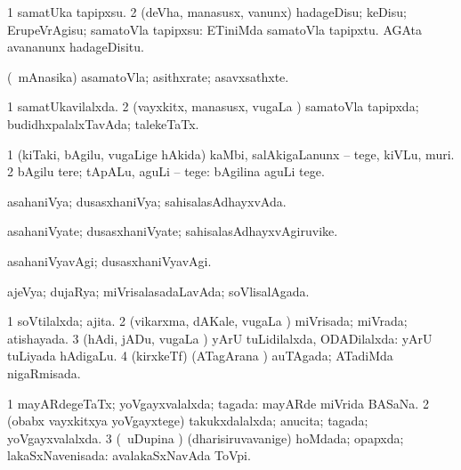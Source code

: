\bentry
{} 
\gl{\sakirx}
\expl{}
\bmng
\bnum
\num{1} samatUka tapipxsu. 
\num{2} (deVha, manasusx, \mo vanunx) hadageDisu; keDisu; ErupeVrAgisu; samatoVla tapipxsu:  ETiniMda samatoVla tapipxtu.  AGAta avananunx hadageDisitu. 
\enum
\emng
\eentry

\bentry
{} 
\gl{\nA}
\expl{}
\bmng
(\kanmu\ mAnasika) asamatoVla; asithxrate; asavxsathxte. 
\emng
\eentry

\bentry
{} 
\gl{\gu}
\expl{}
\bmng
\bnum
\num{1} samatUkavilalxda. 
\num{2} (vayxkitx, manasusx, \mo vugaLa \vi) samatoVla tapipxda; budidhxpalalxTavAda; talekeTaTx. 
\enum
\emng
\eentry

\bentry
{} 
\gl{\sakirx}
\bmng
\bnum
\num{1} (kiTaki, bAgilu, \mo vugaLige hAkida) kaMbi, salAkigaLanunx -- tege, kiVLu, muri. 
\num{2} bAgilu tere; tApALu, aguLi -- tege:  bAgilina aguLi tege. 
\enum
\emng
\eentry

\bentry
{} 
\gl{\gu}
\expl{}
\bmng
asahaniVya; dusasxhaniVya; sahisalasAdhayxvAda. 
\emng
\eentry

\bentry
{} 
\gl{\nA}
\expl{}
\bmng
asahaniVyate; dusasxhaniVyate; sahisalasAdhayxvAgiruvike. 
\emng
\eentry

\bentry
{} 
\gl{\kirxvi}
\expl{}
\bmng
asahaniVyavAgi; dusasxhaniVyavAgi. 
\emng
\eentry

\bentry
{} 
\gl{\gu}
\expl{}
\bmng
ajeVya; dujaRya; miVrisalasadaLavAda; soVlisalAgada. 
\emng
\eentry

\bentry
{} 
\gl{\gu}
\expl{}
\bmng
\bnum
\num{1} soVtilalxda; ajita. 
\num{2} (vikarxma, dAKale, \mo vugaLa \vi) miVrisada; miVrada; atishayada. 
\num{3} (hAdi, jADu, \mo vugaLa \vi) yArU tuLidilalxda, ODADilalxda:  yArU tuLiyada hAdigaLu. 
\num{4} (kirxkeTf) (ATagArana \vi) auTAgada; ATadiMda nigaRmisada. 
\enum
\emng
\eentry

\bentry
{} 
\gl{\gu}
\expl{}
\bmng
\bnum
\num{1} mayARdegeTaTx; yoVgayxvalalxda; tagada:  mayARde miVrida BASaNa. 
\num{2} (obabx vayxkitxya yoVgayxtege) takukxdalalxda; anucita; tagada; yoVgayxvalalxda. 
\num{3} (\kanmu\ uDupina \vi) (dharisiruvavanige) hoMdada; opapxda; lakaSxNavenisada:  avalakaSxNavAda ToVpi. 
\enum
\emng
\eentry

